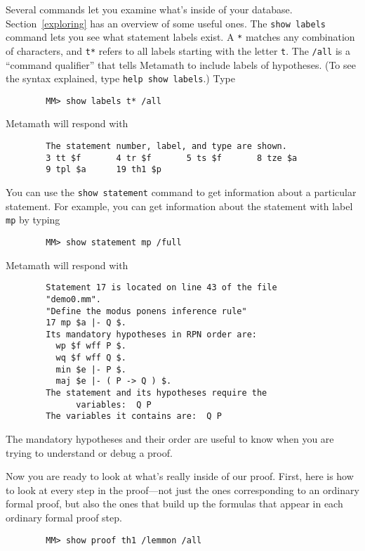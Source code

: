 Several commands let you examine what's inside of your database.
Section~\ref{exploring} has an overview of some useful ones.  The
\texttt{show labels} command lets you see what statement
labels exist.  A \texttt{*} matches any combination of
characters, and \texttt{t*} refers to all labels starting with the
letter \texttt{t}. The \texttt{/all}
is a ``command qualifier'' that tells Metamath
to include labels of hypotheses.  (To see the syntax explained, type
\texttt{help show labels}.)  Type
\begin{verbatim}
        MM> show labels t* /all
\end{verbatim}
Metamath will respond with
\begin{verbatim}
        The statement number, label, and type are shown.
        3 tt $f       4 tr $f       5 ts $f       8 tze $a
        9 tpl $a      19 th1 $p
\end{verbatim}

You can use the \texttt{show statement} command to get information about a
particular statement.
For example, you can get information about the statement with label \texttt{mp}
by typing
\begin{verbatim}
        MM> show statement mp /full
\end{verbatim}
Metamath will respond with
\begin{verbatim}
        Statement 17 is located on line 43 of the file
        "demo0.mm".
        "Define the modus ponens inference rule"
        17 mp $a |- Q $.
        Its mandatory hypotheses in RPN order are:
          wp $f wff P $.
          wq $f wff Q $.
          min $e |- P $.
          maj $e |- ( P -> Q ) $.
        The statement and its hypotheses require the
              variables:  Q P
        The variables it contains are:  Q P
\end{verbatim}
The mandatory hypotheses and their
order are
useful to know when you are trying to understand or debug a proof.

Now you are ready to look at what's really inside of our proof.  First, here is
how to look at every step in the proof---not just the ones corresponding to an
ordinary formal proof, but also the ones that build up the
formulas that appear in each ordinary formal proof step.
\begin{verbatim}
        MM> show proof th1 /lemmon /all
\end{verbatim}

